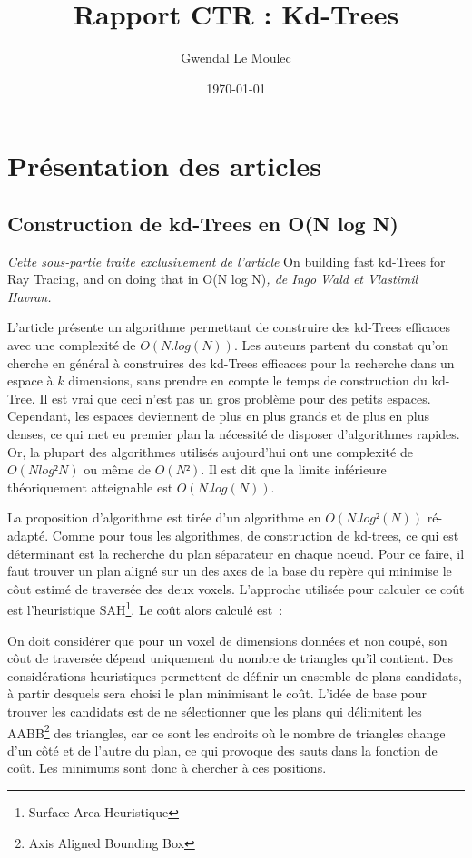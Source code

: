 \documentclass[a4paper]{article}
\title{Rapport CTR : Kd-Trees}
\author{Gwendal Le Moulec}
\date{\today}
\begin{document}
\section{Présentation des articles}

\subsection{Construction de kd-Trees en O(N log N)}

\textit{Cette sous-partie traite exclusivement de l'article} On building fast kd-Trees for Ray Tracing, and on doing that in O(N log N)\textit{, de Ingo Wald et Vlastimil Havran.}

L'article présente un algorithme permettant de construire des kd-Trees efficaces avec une complexité de $O(N.log(N))$. Les auteurs partent du constat qu'on cherche en général à construires des kd-Trees efficaces pour la recherche dans un espace à $k$ dimensions, sans prendre en compte le temps de construction du kd-Tree. Il est vrai que ceci n'est pas un gros problème pour des petits espaces. Cependant, les espaces deviennent de plus en plus grands et de plus en plus denses, ce qui met eu premier plan la nécessité de disposer d'algorithmes rapides. Or, la plupart des algorithmes utilisés aujourd'hui ont une complexité de $O(Nlog²N)$ ou même de $O(N²)$. Il est dit que la limite inférieure théoriquement atteignable est $O(N.log(N))$.

La proposition d'algorithme est tirée d'un algorithme en $O(N.log²(N))$ ré-adapté. Comme pour tous les algorithmes, de construction de kd-trees, ce qui est déterminant est la recherche du plan séparateur en chaque noeud. Pour ce faire, il faut trouver un plan aligné sur un des axes de la base du repère qui minimise le côut estimé de traversée des deux voxels. L'approche utilisée pour calculer ce coût est l'heuristique SAH\footnote{Surface Area Heuristique}. Le coût alors calculé est~:


On doit considérer que pour un voxel de dimensions données et non coupé, son côut de traversée dépend uniquement du nombre de triangles qu'il contient.
Des considérations heuristiques permettent de définir un ensemble de plans candidats, à partir desquels sera choisi le plan minimisant le coût. L'idée de base pour trouver les candidats est de ne sélectionner que les plans qui délimitent les AABB\footnote{Axis Aligned Bounding Box} des triangles, car ce sont les endroits où le nombre de triangles change d'un c\^oté et de l'autre du plan, ce qui provoque des sauts dans la fonction de co\^ut. Les minimums sont donc à chercher à ces positions.
\end{document}
